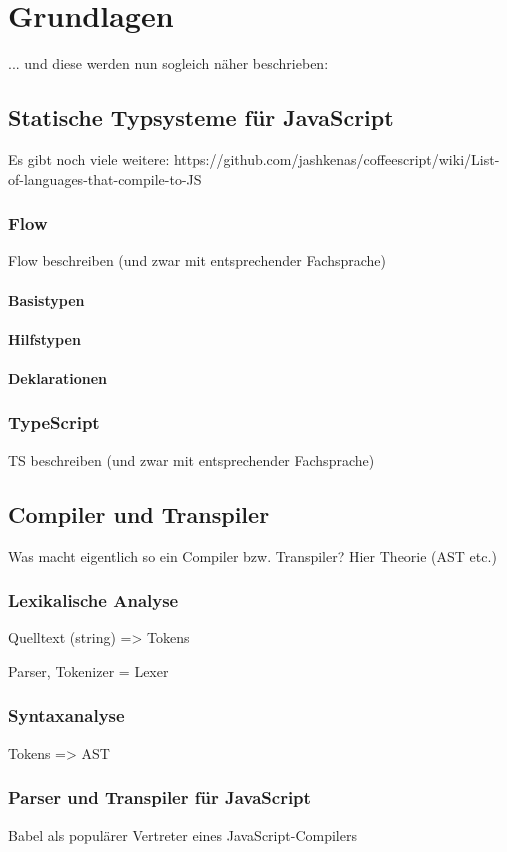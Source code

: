 \chapter{Grundlagen}

... und diese werden nun sogleich näher beschrieben:

\section{Statische Typsysteme für JavaScript}

  Es gibt noch viele weitere: https://github.com/jashkenas/coffeescript/wiki/List-of-languages-that-compile-to-JS

  \subsection{Flow}
    Flow beschreiben (und zwar mit entsprechender Fachsprache)

    \subsubsection{Basistypen}
    \subsubsection{Hilfstypen}
    \subsubsection{Deklarationen}

  \subsection{TypeScript}
    TS beschreiben (und zwar mit entsprechender Fachsprache)

\section{Compiler und Transpiler}

  Was macht eigentlich so ein Compiler bzw. Transpiler? Hier Theorie (AST etc.)


  \subsection{Lexikalische Analyse}

    Quelltext (string) => Tokens

    Parser, Tokenizer = Lexer

  \subsection{Syntaxanalyse}

    Tokens => AST


  \subsection{Parser und Transpiler für JavaScript}
  \label{subsec:js-transpilers}

    Babel als populärer Vertreter eines JavaScript-Compilers
